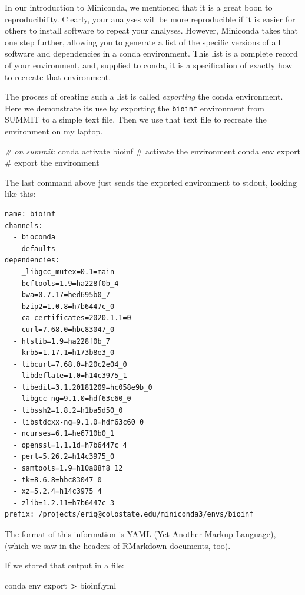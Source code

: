 \documentclass[]{krantz}
\makeatletter
\newenvironment{Shaded}{\begin{snugshade}}{\end{snugshade}}
\newcommand{\CommentTok}[1]{\textcolor[rgb]{0.37,0.37,0.37}{\textit{#1}}}
\newcommand{\ExtensionTok}[1]{#1}
\newcommand{\NormalTok}[1]{#1}
\newcommand{\OperatorTok}[1]{\textcolor[rgb]{0.43,0.43,0.43}{\textbf{#1}}}
\newenvironment{kframe}{%
\medskip{}
\setlength{\fboxsep}{.8em}
 \def\at@end@of@kframe{}%
 \ifinner\ifhmode%
  \def\at@end@of@kframe{\end{minipage}}%
  \begin{minipage}{\columnwidth}%
 \fi\fi%
 \def\FrameCommand##1{\hskip\@totalleftmargin \hskip-\fboxsep
 \colorbox{shadecolor}{##1}\hskip-\fboxsep
     \hskip-\linewidth \hskip-\@totalleftmargin \hskip\columnwidth}%
 \MakeFramed {\advance\hsize-\width
   \@totalleftmargin\z@ \linewidth\hsize
   \@setminipage}}%
 {\par\unskip\endMakeFramed%
 \at@end@of@kframe}
\renewenvironment{Shaded}{\begin{kframe}}{\end{kframe}}
\makeatother
\begin{document}
In our introduction to Miniconda, we mentioned that it is a great boon to
reproducibility. Clearly, your analyses will be more reproducible if it is
easier for others to install software to repeat your analyses. However, Miniconda
takes that one step further, allowing you to generate a list of
the specific versions of
all software and dependencies in a conda environment. This list is a complete
record of your environment, and, supplied to conda, it is a specification of
exactly how to recreate that environment.

The process of creating such a list is called \emph{exporting} the conda
environment. Here we demonstrate its use by exporting the \texttt{bioinf}
environment from SUMMIT to a simple text file. Then we use that text file
to recreate the environment on my laptop.

\begin{Shaded}
\begin{Highlighting}[]
\CommentTok{# on summit:}
\ExtensionTok{conda}\NormalTok{ activate bioinf          # activate the environment}
\ExtensionTok{conda}\NormalTok{ env export               # export the environment}
\end{Highlighting}
\end{Shaded}

The last command above just sends the exported environment
to stdout, looking like this:

\begin{verbatim}
name: bioinf
channels:
  - bioconda
  - defaults
dependencies:
  - _libgcc_mutex=0.1=main
  - bcftools=1.9=ha228f0b_4
  - bwa=0.7.17=hed695b0_7
  - bzip2=1.0.8=h7b6447c_0
  - ca-certificates=2020.1.1=0
  - curl=7.68.0=hbc83047_0
  - htslib=1.9=ha228f0b_7
  - krb5=1.17.1=h173b8e3_0
  - libcurl=7.68.0=h20c2e04_0
  - libdeflate=1.0=h14c3975_1
  - libedit=3.1.20181209=hc058e9b_0
  - libgcc-ng=9.1.0=hdf63c60_0
  - libssh2=1.8.2=h1ba5d50_0
  - libstdcxx-ng=9.1.0=hdf63c60_0
  - ncurses=6.1=he6710b0_1
  - openssl=1.1.1d=h7b6447c_4
  - perl=5.26.2=h14c3975_0
  - samtools=1.9=h10a08f8_12
  - tk=8.6.8=hbc83047_0
  - xz=5.2.4=h14c3975_4
  - zlib=1.2.11=h7b6447c_3
prefix: /projects/eriq@colostate.edu/miniconda3/envs/bioinf
\end{verbatim}

The format of this information is YAML (Yet Another Markup Language),
(which we saw in the headers of RMarkdown documents, too).

If we stored that output in a file:

\begin{Shaded}
\begin{Highlighting}[]
\ExtensionTok{conda}\NormalTok{ env export }\OperatorTok{>}\NormalTok{ bioinf.yml}
\end{Highlighting}
\end{Shaded}
\end{document}
